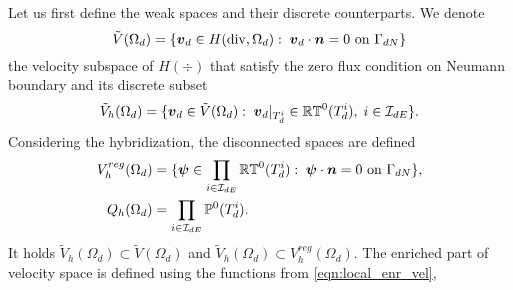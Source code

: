 Let us first define the weak spaces and their discrete counterparts.
We denote
\begin{equation}
    \tilde V(\Omega_d) = \{\mathbf{\boldsymbol{v}}_d \in H({\rm div},\Omega_d):\; \mathbf{\boldsymbol{v}}_d \cdot \mathbf{\boldsymbol{n}} = 0 \textrm{ on } \Gamma_{dN}\}
\end{equation}
the velocity subspace of $H(\div)$ that satisfy the zero flux condition on Neumann boundary
and its discrete subset
\begin{equation}
    \tilde V_h(\Omega_d) = \{\mathbf{\boldsymbol{v}}_d \in \tilde V(\Omega_d):\; \mathbf{\boldsymbol{v}}_d|_{T^i_d} \in\mathbb{RT}^0(T^i_d),\; i\in\mathcal{I}_{dE}\}.
\end{equation}
Considering the hybridization, the disconnected spaces are defined
\begin{align}
    V^{reg}_{h}(\Omega_d) &= \{\mathbf{\boldsymbol{\psi}} \in \prod_{i\in\mathcal{I}_{dE}} \mathbb{RT}^0(T^i_d):\;
        \mathbf{\boldsymbol{\psi}} \cdot \mathbf{\boldsymbol{n}} = 0 \textrm{ on } \Gamma_{dN}\}, \\
    Q_h(\Omega_d) &= \prod_{i\in\mathcal{I}_{dE}} \mathbb{P}^0(T^i_d).
\end{align}
It holds $\tilde V_h(\Omega_d) \subset \tilde V(\Omega_d)$ and $\tilde V_h(\Omega_d) \subset V^{reg}_h(\Omega_d)$.
The enriched part of velocity space is defined using the functions from \eqref{eqn:local_enr_vel},
